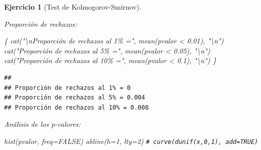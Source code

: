 \documentclass[
]{book}
\newenvironment{Shaded}{\begin{snugshade}}{\end{snugshade}}
\newcommand{\AttributeTok}[1]{\textcolor[rgb]{0.77,0.63,0.00}{#1}}
\newcommand{\CommentTok}[1]{\textcolor[rgb]{0.56,0.35,0.01}{\textit{#1}}}
\newcommand{\ConstantTok}[1]{\textcolor[rgb]{0.00,0.00,0.00}{#1}}
\newcommand{\ControlFlowTok}[1]{\textcolor[rgb]{0.13,0.29,0.53}{\textbf{#1}}}
\newcommand{\DecValTok}[1]{\textcolor[rgb]{0.00,0.00,0.81}{#1}}
\newcommand{\FloatTok}[1]{\textcolor[rgb]{0.00,0.00,0.81}{#1}}
\newcommand{\FunctionTok}[1]{\textcolor[rgb]{0.00,0.00,0.00}{#1}}
\newcommand{\NormalTok}[1]{#1}
\newcommand{\OtherTok}[1]{\textcolor[rgb]{0.56,0.35,0.01}{#1}}
\newcommand{\SpecialCharTok}[1]{\textcolor[rgb]{0.00,0.00,0.00}{#1}}
\newcommand{\StringTok}[1]{\textcolor[rgb]{0.31,0.60,0.02}{#1}}
\theoremstyle{break}
\newtheorem{exercise}{Ejercicio}[chapter]
\theoremstyle{nonumberplain}
\renewcommand{\CommentTok}[1]{\textcolor[rgb]{0.41,0.41,0.41}{\texttt{#1}}}
\begin{document}
\begin{exercise}[Test de Kolmogorov-Smirnov]
\begin{enumerate}
\begin{Shaded}
\end{Shaded}

  Proporción de rechazos:

\begin{Shaded}
\begin{Highlighting}[]
\NormalTok{\{}
  \FunctionTok{cat}\NormalTok{(}\StringTok{"}\SpecialCharTok{\textbackslash{}n}\StringTok{Proporción de rechazos al 1\% ="}\NormalTok{, }\FunctionTok{mean}\NormalTok{(pvalor }\SpecialCharTok{\textless{}} \FloatTok{0.01}\NormalTok{), }\StringTok{"}\SpecialCharTok{\textbackslash{}n}\StringTok{"}\NormalTok{)}
  \FunctionTok{cat}\NormalTok{(}\StringTok{"Proporción de rechazos al 5\% ="}\NormalTok{, }\FunctionTok{mean}\NormalTok{(pvalor }\SpecialCharTok{\textless{}} \FloatTok{0.05}\NormalTok{), }\StringTok{"}\SpecialCharTok{\textbackslash{}n}\StringTok{"}\NormalTok{)}
  \FunctionTok{cat}\NormalTok{(}\StringTok{"Proporción de rechazos al 10\% ="}\NormalTok{, }\FunctionTok{mean}\NormalTok{(pvalor }\SpecialCharTok{\textless{}} \FloatTok{0.1}\NormalTok{), }\StringTok{"}\SpecialCharTok{\textbackslash{}n}\StringTok{"}\NormalTok{)}
\NormalTok{\}}
\end{Highlighting}
\end{Shaded}

\begin{verbatim}
## 
## Proporción de rechazos al 1% = 0 
## Proporción de rechazos al 5% = 0.004 
## Proporción de rechazos al 10% = 0.008
\end{verbatim}

  Análisis de los p-valores:

\begin{Shaded}
\begin{Highlighting}[]
\FunctionTok{hist}\NormalTok{(pvalor, }\AttributeTok{freq=}\ConstantTok{FALSE}\NormalTok{)}
\FunctionTok{abline}\NormalTok{(}\AttributeTok{h=}\DecValTok{1}\NormalTok{, }\AttributeTok{lty=}\DecValTok{2}\NormalTok{)   }\CommentTok{\# curve(dunif(x,0,1), add=TRUE)}
\end{Highlighting}
\end{Shaded}


\end{enumerate}
\end{exercise}
\end{document}
